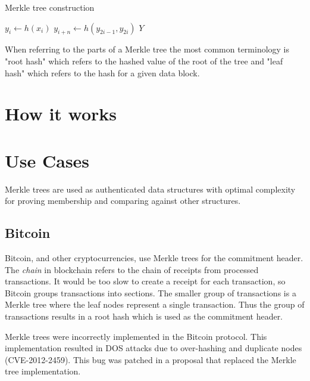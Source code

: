 \documentclass[12pt]{article}
\begin{document}
 \begin{algorithm}[H]
 	\caption{Merkle tree construction}
 	\begin{algorithmic}
 		 
 		\State $y_i \leftarrow h(x_i)$  
 		\EndFor
 		   
 		\State $y_{i+n} \leftarrow h(y_{2i-1}, y_{2i}) $ 
 		\EndFor
 		\State \Return $Y$ 
 	\end{algorithmic}
 \end{algorithm}
 
When referring to the parts of a Merkle tree the most common terminology is "root hash" which refers to the hashed value of the root of the tree and "leaf hash" which refers to the hash for a given data block. 



\section{How it works}



\section{Use Cases}

Merkle trees are used as authenticated data structures with optimal complexity for proving membership and comparing against other structures. 

\subsection{Bitcoin} \label{sec:Bitcoin}

Bitcoin, and other cryptocurrencies, use Merkle trees for the commitment header.  The \textit{chain} in blockchain refers to the chain of receipts from processed transactions. It would be too slow to create a receipt for each transaction, so Bitcoin groups transactions into sections. The smaller group of transactions is a Merkle tree where the leaf nodes represent a single transaction. Thus the group of transactions results in a root hash which is used as the commitment header.

Merkle trees were incorrectly implemented in the Bitcoin protocol. This implementation resulted in DOS attacks due to over-hashing and duplicate nodes (CVE-2012-2459). This bug was patched in a proposal that replaced the Merkle tree implementation\cite{friedenbach_alm_2017}.
\end{document}
